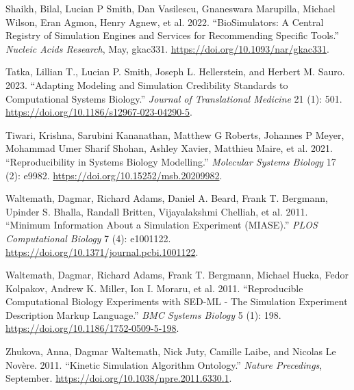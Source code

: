 \documentclass[
  a4paper,
]{scrartcl}
\newlength{\cslhangindent}
\newenvironment{CSLReferences}[2] %
 {\begin{list}{}{%
  \setlength{\itemindent}{0pt}
  \setlength{\leftmargin}{0pt}
  \setlength{\parsep}{0pt}
  \ifodd #1
   \setlength{\leftmargin}{\cslhangindent}
   \setlength{\itemindent}{-1\cslhangindent}
  \fi
  \setlength{\itemsep}{#2\baselineskip}}}
 {\end{list}}
\begin{document}
\begin{CSLReferences}{1}{0}
Shaikh, Bilal, Lucian P Smith, Dan Vasilescu, Gnaneswara Marupilla,
Michael Wilson, Eran Agmon, Henry Agnew, et al. 2022.
{``{BioSimulators}: A Central Registry of Simulation Engines and
Services for Recommending Specific Tools.''} \emph{Nucleic Acids
Research}, May, gkac331. \url{https://doi.org/10.1093/nar/gkac331}.

Tatka, Lillian T., Lucian P. Smith, Joseph L. Hellerstein, and Herbert
M. Sauro. 2023. {``Adapting Modeling and Simulation Credibility
Standards to Computational Systems Biology.''} \emph{Journal of
Translational Medicine} 21 (1): 501.
\url{https://doi.org/10.1186/s12967-023-04290-5}.

Tiwari, Krishna, Sarubini Kananathan, Matthew G Roberts, Johannes P
Meyer, Mohammad Umer Sharif Shohan, Ashley Xavier, Matthieu Maire, et
al. 2021. {``Reproducibility in Systems Biology Modelling.''}
\emph{Molecular Systems Biology} 17 (2): e9982.
\url{https://doi.org/10.15252/msb.20209982}.

Waltemath, Dagmar, Richard Adams, Daniel A. Beard, Frank T. Bergmann,
Upinder S. Bhalla, Randall Britten, Vijayalakshmi Chelliah, et al. 2011.
{``Minimum {Information} {About} a {Simulation} {Experiment}
({MIASE}).''} \emph{PLOS Computational Biology} 7 (4): e1001122.
\url{https://doi.org/10.1371/journal.pcbi.1001122}.

Waltemath, Dagmar, Richard Adams, Frank T. Bergmann, Michael Hucka,
Fedor Kolpakov, Andrew K. Miller, Ion I. Moraru, et al. 2011.
{``Reproducible Computational Biology Experiments with {SED}-{ML} -
{The} {Simulation} {Experiment} {Description} {Markup} {Language}.''}
\emph{BMC Systems Biology} 5 (1): 198.
\url{https://doi.org/10.1186/1752-0509-5-198}.

Zhukova, Anna, Dagmar Waltemath, Nick Juty, Camille Laibe, and Nicolas
Le Novère. 2011. {``Kinetic {Simulation} {Algorithm} {Ontology}.''}
\emph{Nature Precedings}, September.
\url{https://doi.org/10.1038/npre.2011.6330.1}.

\end{CSLReferences}
\end{document}

